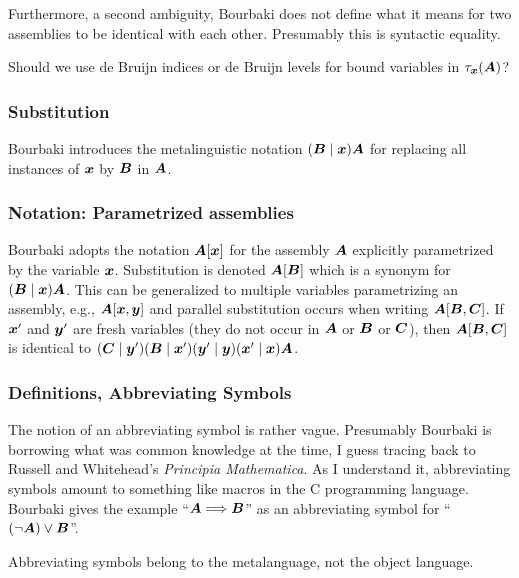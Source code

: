 Furthermore, a second ambiguity, Bourbaki does not define what it means
for two assemblies to be identical with each other. Presumably this is
syntactic equality.

\begin{puzzle}
Should we use de Bruijn indices or de Bruijn levels for bound variables
in $\tau_{\boldsymbol{x}}(\boldsymbol{A})$?
\end{puzzle}

\subsubsection{Substitution}
Bourbaki introduces the metalinguistic notation $(\boldsymbol{B}\mid\boldsymbol{x})\boldsymbol{A}$
for replacing all instances of $\boldsymbol{x}$ by $\boldsymbol{B}$
in $\boldsymbol{A}$.

\subsubsection{Notation: Parametrized assemblies}
Bourbaki adopts the notation $\boldsymbol{A}[\boldsymbol{x}]$ for
the assembly $\boldsymbol{A}$ explicitly parametrized by the variable
$\boldsymbol{x}$. Substitution is denoted $\boldsymbol{A}[\boldsymbol{B}]$
which is a synonym for $(\boldsymbol{B}\mid\boldsymbol{x})\boldsymbol{A}$.
This can be generalized to multiple variables parametrizing an assembly,
e.g., $\boldsymbol{A}[\boldsymbol{x}, \boldsymbol{y}]$ and
parallel substitution occurs when writing
$\boldsymbol{A}[\boldsymbol{B},\boldsymbol{C}]$. If
$\boldsymbol{x}'$ and $\boldsymbol{y}'$ are fresh variables (they do
not occur in $\boldsymbol{A}$ or $\boldsymbol{B}$ or $\boldsymbol{C}$),
then $\boldsymbol{A}[\boldsymbol{B}, \boldsymbol{C}]$ is identical
to $(\boldsymbol{C}\mid\boldsymbol{y}')(\boldsymbol{B}\mid\boldsymbol{x}')(\boldsymbol{y}'\mid\boldsymbol{y})(\boldsymbol{x}'\mid\boldsymbol{x})\boldsymbol{A}$.

\subsubsection{Definitions, Abbreviating Symbols}\label{subsec:1-1:definitions:abbreviating-symbols}
The notion of an abbreviating symbol is rather vague. Presumably
Bourbaki is borrowing what was common knowledge at the time, I guess
tracing back to Russell and Whitehead's \textit{Principia Mathematica}.
As I understand it, abbreviating symbols amount to something like macros
in the C programming language. Bourbaki gives the example
``$\boldsymbol{A}\Longrightarrow\boldsymbol{B}$'' as an abbreviating symbol
for ``$(\neg\boldsymbol{A})\lor\boldsymbol{B}$''.

Abbreviating symbols belong to the metalanguage, not the object
language.

